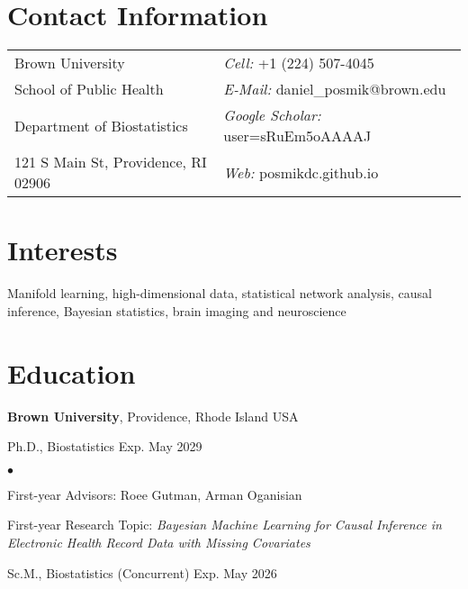 \documentclass[margin,line]{res}
\newenvironment{list1}{
  \begin{list}{\ding{113}}{%
      \setlength{\itemsep}{0in}
      \setlength{\parsep}{0in} \setlength{\parskip}{0in}
      \setlength{\topsep}{0in} \setlength{\partopsep}{0in} 
      \setlength{\leftmargin}{0.17in}}}{\end{list}}
\newenvironment{list2}{
  \begin{list}{$\bullet$}{%
      \setlength{\itemsep}{0in}
      \setlength{\parsep}{0in} \setlength{\parskip}{0in}
      \setlength{\topsep}{0in} \setlength{\partopsep}{0in} 
      \setlength{\leftmargin}{0.2in}}}{\end{list}}
\begin{document}

\begin{resume}
\section{\sc Contact Information}
\vspace{.05in}
\begin{tabular}{@{}p{3in}p{4in}}
Brown University & {\it Cell:} +1 (224) 507-4045 \\            
School of Public Health & {\it E-Mail:} {daniel\_posmik@brown.edu} \\    
Department of Biostatistics & {\it Google Scholar:} user=sRuEm5oAAAAJ \\
121 S Main St, Providence, RI 02906 & {\it Web:} posmikdc.github.io \\       
\end{tabular}


\section{\sc Interests}
Manifold learning, high-dimensional data, statistical network analysis, causal inference, Bayesian statistics, brain imaging and neuroscience

\section{\sc Education}
{\bf Brown University}, Providence, Rhode Island USA\\
\vspace*{-.1in}
\begin{list1}
  \item[] Ph.D., Biostatistics \hfill Exp. May 2029

\begin{list2}
\vspace*{.05in}
\item First-year Advisors: Roee Gutman, Arman Oganisian
\item First-year Research Topic: {\em Bayesian Machine Learning for Causal Inference in Electronic Health Record Data with Missing Covariates}
\end{list2}
\vspace*{.05in}
\item[] Sc.M., Biostatistics (Concurrent) \hfill Exp. May 2026
\end{list1}


\end{resume}
\end{document}
